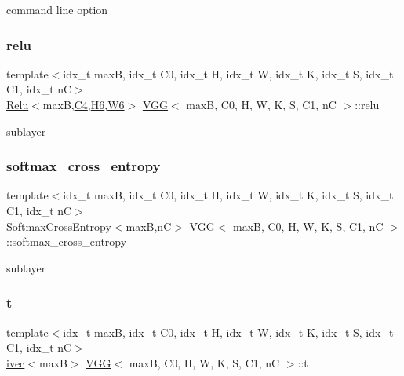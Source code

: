 command line option \mbox{\label{structVGG_acc01c963dd716345709ab91f5eb6e2e3}} 
\subsubsection{\texorpdfstring{relu}{relu}}
{\footnotesize\ttfamily template$<$idx\+\_\+t maxB, idx\+\_\+t C0, idx\+\_\+t H, idx\+\_\+t W, idx\+\_\+t K, idx\+\_\+t S, idx\+\_\+t C1, idx\+\_\+t nC$>$ \\
\hyperlink{structRelu}{Relu}$<$maxB,\hyperlink{structVGG_a4d54a1cc3e99340dfb67e7252719c663}{C4},\hyperlink{structVGG_aca7e136480c1e76d74bda917c1ddca97}{H6},\hyperlink{structVGG_ada7bec62e12fac368b103ae3d8c59c0e}{W6}$>$ \hyperlink{structVGG}{V\+GG}$<$ maxB, C0, H, W, K, S, C1, nC $>$\+::relu}

sublayer \mbox{\label{structVGG_af4bbc09cef74dbbff99b5a35f2c40608}} 
\subsubsection{\texorpdfstring{softmax\+\_\+cross\+\_\+entropy}{softmax\_cross\_entropy}}
{\footnotesize\ttfamily template$<$idx\+\_\+t maxB, idx\+\_\+t C0, idx\+\_\+t H, idx\+\_\+t W, idx\+\_\+t K, idx\+\_\+t S, idx\+\_\+t C1, idx\+\_\+t nC$>$ \\
\hyperlink{structSoftmaxCrossEntropy}{Softmax\+Cross\+Entropy}$<$maxB,nC$>$ \hyperlink{structVGG}{V\+GG}$<$ maxB, C0, H, W, K, S, C1, nC $>$\+::softmax\+\_\+cross\+\_\+entropy}

sublayer \mbox{\label{structVGG_a302cf15e5bd6f920d527334df6f3e2b2}} 
\subsubsection{\texorpdfstring{t}{t}}
{\footnotesize\ttfamily template$<$idx\+\_\+t maxB, idx\+\_\+t C0, idx\+\_\+t H, idx\+\_\+t W, idx\+\_\+t K, idx\+\_\+t S, idx\+\_\+t C1, idx\+\_\+t nC$>$ \\
\hyperlink{structivec}{ivec}$<$maxB$>$ \hyperlink{structVGG}{V\+GG}$<$ maxB, C0, H, W, K, S, C1, nC $>$\+::t}

